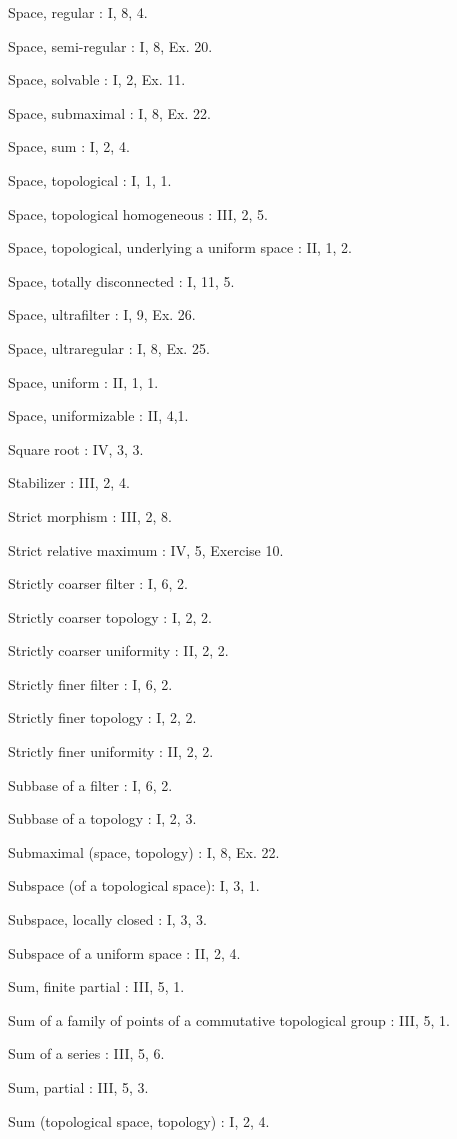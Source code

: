 Space, regular : I, 8, 4.

Space, semi-regular : I, 8, Ex. 20.

Space, solvable : I, 2, Ex. 11.

Space, submaximal : I, 8, Ex. 22.

Space, sum : I, 2, 4.

Space, topological : I, 1, 1.

Space, topological homogeneous : III, 2, 5.

Space, topological, underlying a uniform space : II, 1, 2.

Space, totally disconnected : I, 11, 5.

Space, ultrafilter : I, 9, Ex. 26.

Space, ultraregular : I, 8, Ex. 25.

Space, uniform : II, 1, 1.

Space, uniformizable : II, 4,1.

Square root : IV, 3, 3.

Stabilizer : III, 2, 4.

Strict morphism : III, 2, 8.

Strict relative maximum : IV, 5, Exercise 10.

Strictly coarser filter : I, 6, 2.

Strictly coarser topology : I, 2, 2.

Strictly coarser uniformity : II, 2, 2.

Strictly finer filter : I, 6, 2.

Strictly finer topology : I, 2, 2.

Strictly finer uniformity : II, 2, 2.

Subbase of a filter : I, 6, 2.

Subbase of a topology : I, 2, 3.

Submaximal (space, topology) : I, 8, Ex. 22.

Subspace (of a topological space): I, 3, 1.

Subspace, locally closed : I, 3, 3.

Subspace of a uniform space : II, 2, 4.

Sum, finite partial : III, 5, 1.

Sum of a family of points of a commutative topological group : III, 5, 1.

Sum of a series : III, 5, 6.

Sum, partial : III, 5, 3.

Sum (topological space, topology) : I, 2, 4.


